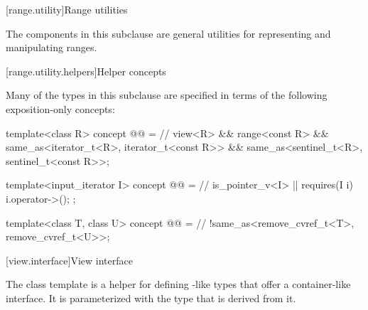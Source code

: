 [range.utility]{Range utilities}

\pnum
The components in this subclause are general utilities for representing and
manipulating ranges.

[range.utility.helpers]{Helper concepts}

\pnum
Many of the types in this subclause are specified in terms of
the following exposition-only concepts:

\begin{codeblock}
template<class R>
  concept @@ =                         // \expos
    view<R> && range<const R> &&
    same_as<iterator_t<R>, iterator_t<const R>> &&
    same_as<sentinel_t<R>, sentinel_t<const R>>;

template<input_iterator I>
  concept @@ =                           // \expos
    is_pointer_v<I> || requires(I i) { i.operator->(); };

template<class T, class U>
  concept @@ =                         // \expos
    !same_as<remove_cvref_t<T>, remove_cvref_t<U>>;
\end{codeblock}

[view.interface]{View interface}

\pnum
The class template  is a helper for defining
-like types that offer a container-like interface. It is
parameterized with the type that is derived from it.


